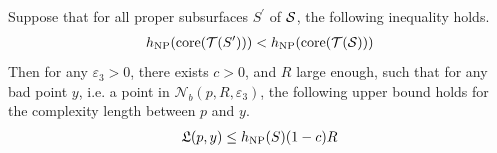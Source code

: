 \documentclass[12pt, reqno]{amsart}
\begin{document}
\begin{theorem}
  \label{thm:linear-gap}
  Suppose that for all proper subsurfaces $S^{\prime}$ of $\mathcal{S}$, the following inequality holds.
  \begin{align*}
    h_{\mathrm{NP}}(\mathrm{core}(\mathcal{T}(S^{\prime}))) < h_{\mathrm{NP}}(\mathrm{core}(\mathcal{T}(\mathcal{S})))
  \end{align*}
  Then for any $\varepsilon_3 > 0$, there exists $c > 0$, and $R$ large enough, such that for any bad point $y$, i.e. a point in $\mathcal{N}_b(p, R, \varepsilon_3)$, the following upper bound holds for the complexity length between $p$ and $y$.
  \begin{align*}
    \mathfrak{L}(p, y) \leq h_{\mathrm{NP}}(S) (1 - c) R
  \end{align*}
\end{theorem}
\end{document}
